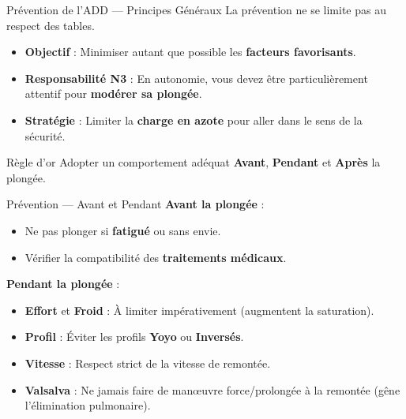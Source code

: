 \begin{frame}{Prévention de l'ADD — Principes Généraux}
    La prévention ne se limite pas au respect des tables.
    
    \begin{itemize}
        \item \textbf{Objectif} : Minimiser autant que possible les \textbf{\textcolor{ffessmred}{facteurs favorisants}}.
        \item \textbf{Responsabilité N3} : En autonomie, vous devez être particulièrement attentif pour \textbf{\textcolor{ffessmred}{modérer sa plongée}}.
        \item \textbf{Stratégie} : Limiter la \textbf{\textcolor{ffessmred}{charge en azote}} pour aller dans le sens de la sécurité.
    \end{itemize}

    \vspace{0.5em}
    \begin{block}{Règle d'or}
        Adopter un comportement adéquat \textbf{Avant}, \textbf{Pendant} et \textbf{Après} la plongée.
    \end{block}
\end{frame}

\begin{frame}{Prévention — Avant et Pendant}
    \textbf{Avant la plongée} :
    \begin{itemize}
        \item Ne pas plonger si \textbf{\textcolor{ffessmred}{fatigué}} ou sans envie.
        \item Vérifier la compatibilité des \textbf{\textcolor{ffessmred}{traitements médicaux}}.
    \end{itemize}

    \vspace{0.5em}
    \textbf{Pendant la plongée} :
    \begin{itemize}
        \item \textbf{\textcolor{ffessmred}{Effort}} et \textbf{\textcolor{ffessmred}{Froid}} : À limiter impérativement (augmentent la saturation).
        \item \textbf{\textcolor{ffessmred}{Profil}} : Éviter les profils \textbf{\textcolor{ffessmred}{Yoyo}} ou \textbf{\textcolor{ffessmred}{Inversés}}.
        \item \textbf{\textcolor{ffessmred}{Vitesse}} : Respect strict de la vitesse de remontée.
        \item \textbf{\textcolor{ffessmred}{Valsalva}} : Ne jamais faire de manœuvre force/prolongée à la remontée (gêne l'élimination pulmonaire).
    \end{itemize}
\end{frame}

